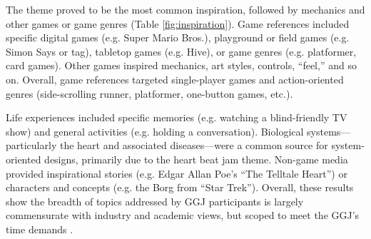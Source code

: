 \documentclass{sig-alternate}
\begin{document}
The theme proved to be the most common inspiration, followed by mechanics and other games or game genres (Table \ref{fig:inspiration}).
Game references included specific digital games (e.g. Super Mario Bros.), playground or field games (e.g. Simon Says or tag), tabletop games (e.g. Hive), or game genres (e.g. platformer, card games). Other games inspired mechanics, art styles, controls, ``feel,'' and so on. 
Overall, game references targeted single-player games and action-oriented genres (side-scrolling runner, platformer, one-button games, etc.).

Life experiences included specific memories (e.g. watching a blind-friendly TV show) and general activities (e.g. holding a conversation).
Biological systems---particularly the heart and associated diseases---were a common source for system-oriented designs, primarily due to the heart beat jam theme.
Non-game media provided inspirational stories (e.g. Edgar Allan Poe's ``The Telltale Heart'') or characters and concepts (e.g. the Borg from ``Star Trek'').
Overall, these results show the breadth of topics addressed by GGJ participants is largely commensurate with industry and academic views, but scoped to meet the GGJ's time demands \cite{bogost2011:howto}.

\end{document}
